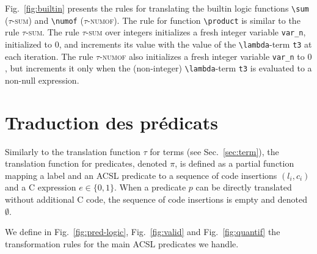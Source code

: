 Fig.~\ref{fig:builtin} presents the rules for translating the builtin
logic functions \lstinline|\sum| (\textsc{$\tau$-sum}) and \lstinline|\numof|
(\textsc{$\tau$-numof}). %
The rule for function %
\lstinline|\product| is similar 
to the rule %
\textsc{$\tau$-sum}.
The rule \textsc{$\tau$-sum} over integers initializes a fresh integer variable
\lstinline|var_n|, initialized to $0$, and increments its value with the value
of the \lstinline|\lambda|-term \lstinline't3' at each iteration.
The rule \textsc{$\tau$-numof} also initializes a fresh integer variable
\lstinline|var_n| to $0$, but increments it only when the (non-integer)
\lstinline|\lambda|-term \lstinline't3' is evaluated to a non-null expression.



\section{Traduction des prédicats \acsl}
\label{sec:pred}

Similarly to the translation function $\tau$ for terms (see
Sec.~\ref{sec:term}), the translation function for predicates, denoted $\pi$,
is defined as a partial function mapping a label and an \textsc{ACSL} predicate
to a sequence of code insertions
$(l_i, c_i)$ and a C expression $e \in \{0, 1\}$.
When a predicate $p$ can be directly translated without additional C code, 
the sequence of code insertions is empty and denoted $\emptyset$.


We define in Fig.~\ref{fig:pred-logic},
Fig.~\ref{fig:valid} and Fig.~\ref{fig:quantif} the transformation rules for the
main \textsc{ACSL} predicates we handle.

